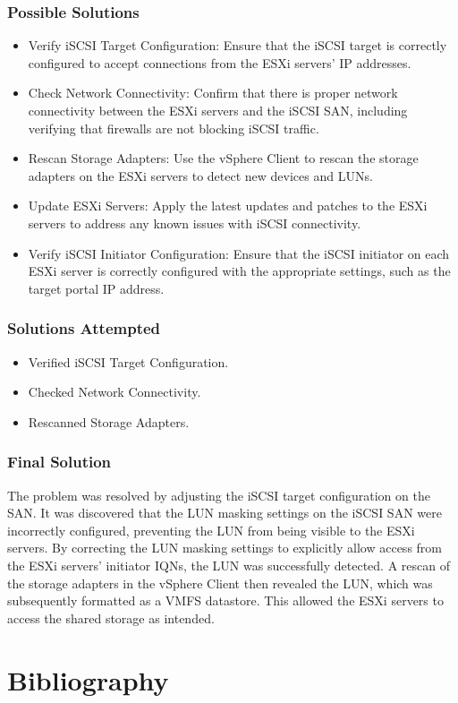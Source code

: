 \documentclass[letterpaper]{article}
\begin{document}
\subsubsection{Possible Solutions}
\label{sec:org682e926}
\begin{itemize}
\item Verify iSCSI Target Configuration: Ensure that the iSCSI target is correctly configured to accept connections from the ESXi servers' IP addresses.
\item Check Network Connectivity: Confirm that there is proper network connectivity between the ESXi servers and the iSCSI SAN, including verifying that firewalls are not blocking iSCSI traffic.
\item Rescan Storage Adapters: Use the vSphere Client to rescan the storage adapters on the ESXi servers to detect new devices and LUNs.
\item Update ESXi Servers: Apply the latest updates and patches to the ESXi servers to address any known issues with iSCSI connectivity.
\item Verify iSCSI Initiator Configuration: Ensure that the iSCSI initiator on each ESXi server is correctly configured with the appropriate settings, such as the target portal IP address.
\end{itemize}

\subsubsection{Solutions Attempted}
\label{sec:org8b78387}
\begin{itemize}
\item Verified iSCSI Target Configuration.
\item Checked Network Connectivity.
\item Rescanned Storage Adapters.
\end{itemize}

\subsubsection{Final Solution}
\label{sec:orgb5f022b}
The problem was resolved by adjusting the iSCSI target configuration on the SAN. It was discovered that the LUN masking settings on the iSCSI SAN were incorrectly configured, preventing the LUN from being visible to the ESXi servers. By correcting the LUN masking settings to explicitly allow access from the ESXi servers' initiator IQNs, the LUN was successfully detected. A rescan of the storage adapters in the vSphere Client then revealed the LUN, which was subsequently formatted as a VMFS datastore. This allowed the ESXi servers to access the shared storage as intended.

\section{Bibliography}
\label{sec:org9dbd248}
\end{document}
